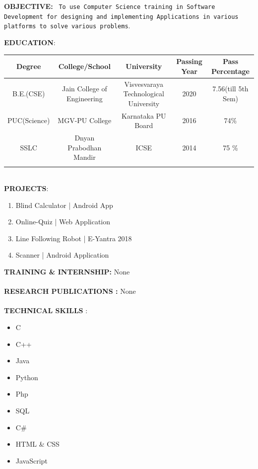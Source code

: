 \documentclass{article}
\begin{document}
		
\large \textbf{OBJECTIVE:}
	\texttt{	
	To use Computer Science training in Software Development for designing and implementing Applications in various platforms to solve various problems}.\\
\vspace{\baselineskip}
	
	\large \textbf{EDUCATION}:
	
	\begin{tabular}{|c|c|c|c|c|}
	\small Degree & \small College/School & \small University & \small Passing Year & \small Pass Percentage \\
		\hline
		\footnotesize  B.E.(CSE)  & \footnotesize Jain College of Engineering & \footnotesize Visvesvaraya Technological University & \footnotesize 2020 & \footnotesize 7.56(till 5th Sem) \\
		\footnotesize PUC(Science) & \footnotesize MGV-PU College & \footnotesize Karnataka PU Board & \footnotesize 2016 &\footnotesize 74\%  \\
		\footnotesize SSLC & \footnotesize Dnyan Prabodhan Mandir & \footnotesize ICSE & \footnotesize 2014 & \footnotesize 75 \%  \\ 
	
\vspace{\baselineskip}
	\end{tabular}
\\
	\large \textbf{PROJECTS}:\\
	\begin{enumerate}
		\item Blind Calculator | Android App
		\item Online-Quiz | Web Application
		\item Line Following Robot | E-Yantra 2018
		\item Scanner | Android Application\\
		
		\vspace{\baselineskip}
	\end{enumerate}
	\large \textbf{TRAINING \&
		INTERNSHIP:}	
	None\\
	\\
	\large \textbf{RESEARCH PUBLICATIONS :}	
	None\\
	\\
	\large \textbf{TECHNICAL SKILLS
}:
	\begin{itemize}
		\item C
		\item C++
		\item Java
		\item Python
		\item Php
		\item SQL
		\item C\#
		\item HTML \& CSS
		\item JavaScript\\
	\end{itemize}
\end{document}

